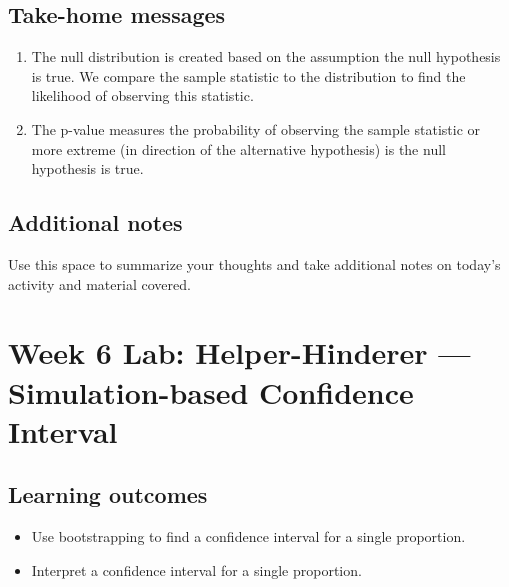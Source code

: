 \documentclass[
]{report}
\begin{document}
\vspace{1in}

\hypertarget{take-home-messages-9}{%
\subsection{Take-home messages}\label{take-home-messages-9}}

\begin{enumerate}
\def\labelenumi{\arabic{enumi}.}
\item
  The null distribution is created based on the assumption the null hypothesis is true. We compare the sample statistic to the distribution to find the likelihood of observing this statistic.
\item
  The p-value measures the probability of observing the sample statistic or more extreme (in direction of the alternative hypothesis) is the null hypothesis is true.
\end{enumerate}

\hypertarget{additional-notes-8}{%
\subsection{Additional notes}\label{additional-notes-8}}

Use this space to summarize your thoughts and take additional notes on today's activity and material covered.

\newpage

\hypertarget{week-6-lab-helper-hinderer-simulation-based-confidence-interval}{%
\section{Week 6 Lab: Helper-Hinderer --- Simulation-based Confidence Interval}\label{week-6-lab-helper-hinderer-simulation-based-confidence-interval}}


\hypertarget{learning-outcomes-11}{%
\subsection{Learning outcomes}\label{learning-outcomes-11}}

\begin{itemize}
\item
  Use bootstrapping to find a confidence interval for a single proportion.
\item
  Interpret a confidence interval for a single proportion.
\end{itemize}
\end{document}
